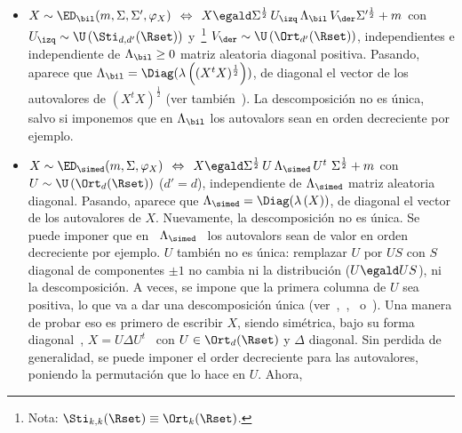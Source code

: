 \begin{itemize}
\begin{itemize}
  \item $X \sim \ED_\bil(m,\Sigma,\Sigma',\varphi_X) \:\: \Leftrightarrow \:\: X
    \egald    \Sigma^{\frac12}   \,   U_\izq    \,   \Lambda_\bil    \,   V_\der
    \Sigma'^{\frac12}   +    m$   \:\:   con   \:\:    $U_\izq   \sim   \U\left(
      \Sti_{d,d'}(\Rset)  \right)$   \:\:  y~\footnote{Nota:  $\Sti_{k,k}(\Rset)
      \equiv  \Ort_k(\Rset)$.}   \:\:  $V_\der  \sim  \U\left(  \Ort_{d'}(\Rset)
    \right)$,  independientes e  independiente  de $\Lambda_\bil  \ge 0$  matriz
    aleatoria   diagonal  positiva.   Pasando,   aparece  que   $\Lambda_\bil  =
    \Diag(\lambda\left( (X^t  X)^{\frac12} \right))$, \ie de  diagonal el vector
    de      los       autovalores      de      $(X^t       X)^\frac12$      (ver
    tambi\'en~\cite[Rep.~2]{Daw77}). La descomposici\'on no es \'unica, salvo si
    imponemos que en $\Lambda_\bil$ los autovalors sean en orden decreciente por
    ejemplo.
%
  \item  $X  \sim  \ED_\simed(m,\Sigma,\varphi_X)  \:\: \Leftrightarrow  \:\:  X
    \egald \Sigma^{\frac12} \,  U \, \Lambda_\simed \, U^t  \ \Sigma^{\frac12} +
    m$  \:\:  con \:\:  $U  \sim \U\left(  \Ort_d(\Rset)  \right)$  ($d' =  d$),
    independiente  de  $\Lambda_\simed$  matriz  aleatoria  diagonal.   Pasando,
    aparece  que  $\Lambda_\simed  =  \Diag(\lambda\left( X  \right))$,  \ie  de
    diagonal   el  vector   de   los  autovalores   de   $X$.   Nuevamente,   la
    descomposici\'on no es \'unica. Se puede imponer que en \ $\Lambda_\simed$ \
    los autovalors sean de valor en orden decreciente por ejemplo. $U$ tambi\'en
    no es \'unica: remplazar $U$ por  $U S$ con $S$ diagonal de componentes $\pm
    1$ no cambia ni la distribuci\'on  ($U \egald U S$), ni la descomposici\'on.
    A veces, se impone  que la primera columna de $U$ sea  positiva, lo que va a
    dar  una descomposici\'on  \'unica (ver~\cite[Teo.~17.3,  fin  de \S~17.3.1,
    Teo.~17.6]{TemCal13},~\cite[Cor.~2.5.2]{AndGui10},~\cite[\S~2.4.2]{DeiGio09}
    o~\cite[\S~8,  p.~34-35]{Gir96}).  Una manera  de probar  eso es  primero de
    escribir  $X$, siendo  sim\'etrica, bajo  su  forma diagonal~\cite{HorJoh13,
      Bha97},  $X  = U  \Delta  U^t$  \ con  $U  \in  \Ort_d(\Rset)$ y  $\Delta$
    diagonal. Sin perdida de generalidad,  se puede imponer el order decreciente
    para las autovalores,  poniendo la permutaci\'on que lo  hace en $U$. Ahora,

\end{itemize}
\end{itemize}
